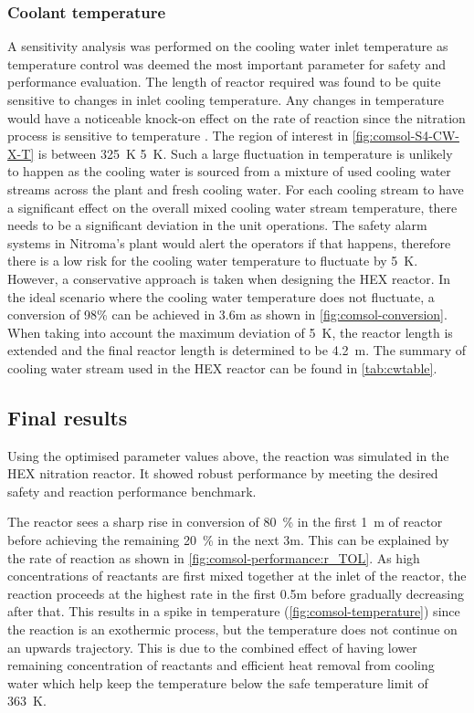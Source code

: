 \subsubsection{Coolant temperature}
A sensitivity analysis was performed on the cooling water inlet temperature as temperature control was deemed the most important parameter for safety and performance evaluation. The length of reactor required was found to be quite sensitive to changes in inlet cooling temperature. Any changes in temperature would have a noticeable knock-on effect on the rate of reaction since the nitration process is sensitive to temperature \cite{chen_experimental_1998}. The region of interest in \cref{fig:comsol-S4-CW-X-T} is between \SI{325}{\K} \pm \SI{5}{\K}. Such a large fluctuation in temperature is unlikely to happen as the cooling water is sourced from a mixture of used cooling water streams across the plant and fresh cooling water. For each cooling stream to have a significant effect on the overall mixed cooling water stream temperature, there needs to be a significant deviation in the unit operations. The safety alarm systems in Nitroma's plant would alert the operators if that happens, therefore there is a low risk for the cooling water temperature to fluctuate by \pm \SI{5}{\K}. However, a conservative approach is taken when designing the HEX reactor. In the ideal scenario where the cooling water temperature does not fluctuate, a conversion of 98\% can be achieved in 3.6m as shown in \cref{fig:comsol-conversion}. When taking into account the maximum deviation of \pm \SI{5}{\K}, the reactor length is extended and the final reactor length is determined to be \SI{4.2}{\metre}. The summary of cooling water stream used in the HEX reactor can be found in \cref{tab:cwtable}.

\subsection{Final results}
\label{finalresults}
Using the optimised parameter values above, the reaction was simulated in the HEX nitration reactor. It showed robust performance by meeting the desired safety and reaction performance benchmark.

The reactor sees a sharp rise in conversion of \approx \SI{80}{\percent} in the first \SI{1}{\metre} of reactor before achieving the remaining \SI{20}{\percent} in the next \approx 3m. This can be explained by the rate of reaction as shown in \cref{fig:comsol-performance:r_TOL}. As high concentrations of reactants are first mixed together at the inlet of the reactor, the reaction proceeds at the highest rate in the first 0.5m before gradually decreasing after that. This results in a spike in temperature (\cref{fig:comsol-temperature}) since the reaction is an exothermic process, but the temperature does not continue on an upwards trajectory. This is due to the combined effect of having lower remaining concentration of reactants and efficient heat removal from cooling water which help keep the temperature below the safe temperature limit of \SI{363}{\K}. 

